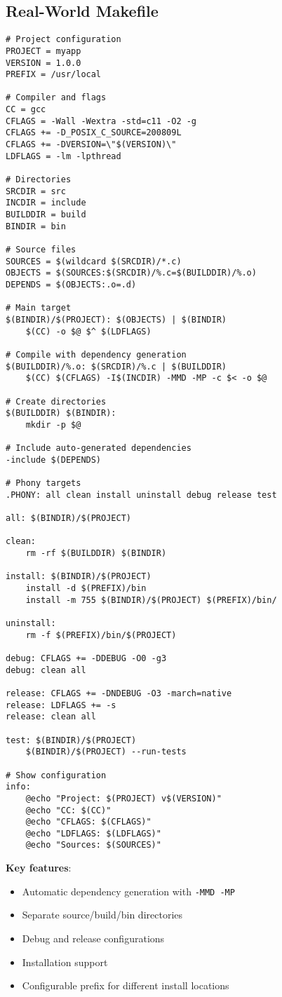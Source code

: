 \subsection{Real-World Makefile}

\begin{lstlisting}
# Project configuration
PROJECT = myapp
VERSION = 1.0.0
PREFIX = /usr/local

# Compiler and flags
CC = gcc
CFLAGS = -Wall -Wextra -std=c11 -O2 -g
CFLAGS += -D_POSIX_C_SOURCE=200809L
CFLAGS += -DVERSION=\"$(VERSION)\"
LDFLAGS = -lm -lpthread

# Directories
SRCDIR = src
INCDIR = include
BUILDDIR = build
BINDIR = bin

# Source files
SOURCES = $(wildcard $(SRCDIR)/*.c)
OBJECTS = $(SOURCES:$(SRCDIR)/%.c=$(BUILDDIR)/%.o)
DEPENDS = $(OBJECTS:.o=.d)

# Main target
$(BINDIR)/$(PROJECT): $(OBJECTS) | $(BINDIR)
	$(CC) -o $@ $^ $(LDFLAGS)

# Compile with dependency generation
$(BUILDDIR)/%.o: $(SRCDIR)/%.c | $(BUILDDIR)
	$(CC) $(CFLAGS) -I$(INCDIR) -MMD -MP -c $< -o $@

# Create directories
$(BUILDDIR) $(BINDIR):
	mkdir -p $@

# Include auto-generated dependencies
-include $(DEPENDS)

# Phony targets
.PHONY: all clean install uninstall debug release test

all: $(BINDIR)/$(PROJECT)

clean:
	rm -rf $(BUILDDIR) $(BINDIR)

install: $(BINDIR)/$(PROJECT)
	install -d $(PREFIX)/bin
	install -m 755 $(BINDIR)/$(PROJECT) $(PREFIX)/bin/

uninstall:
	rm -f $(PREFIX)/bin/$(PROJECT)

debug: CFLAGS += -DDEBUG -O0 -g3
debug: clean all

release: CFLAGS += -DNDEBUG -O3 -march=native
release: LDFLAGS += -s
release: clean all

test: $(BINDIR)/$(PROJECT)
	$(BINDIR)/$(PROJECT) --run-tests

# Show configuration
info:
	@echo "Project: $(PROJECT) v$(VERSION)"
	@echo "CC: $(CC)"
	@echo "CFLAGS: $(CFLAGS)"
	@echo "LDFLAGS: $(LDFLAGS)"
	@echo "Sources: $(SOURCES)"
\end{lstlisting}

\textbf{Key features}:

\begin{itemize}
    \item Automatic dependency generation with \texttt{-MMD -MP}
    \item Separate source/build/bin directories
    \item Debug and release configurations
    \item Installation support
    \item Configurable prefix for different install locations
\end{itemize}

